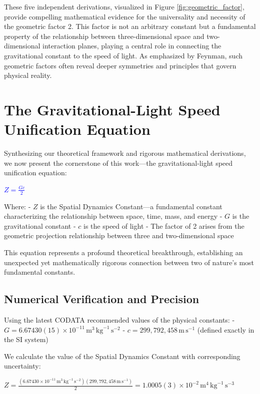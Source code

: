 \documentclass[nature,numbers]{article}
\newcommand{\highlight}[1]{\textcolor{blue}{#1}} %
\begin{document}
These five independent derivations, visualized in Figure \ref{fig:geometric_factor}, provide compelling mathematical evidence for the universality and necessity of the geometric factor 2. This factor is not an arbitrary constant but a fundamental property of the relationship between three-dimensional space and two-dimensional interaction planes, playing a central role in connecting the gravitational constant to the speed of light. As emphasized by Feynman\cite{feynman1964}, such geometric factors often reveal deeper symmetries and principles that govern physical reality.

\section{The Gravitational-Light Speed Unification Equation}

Synthesizing our theoretical framework and rigorous mathematical derivations, we now present the cornerstone of this work—the gravitational-light speed unification equation:

\highlight{$Z = \frac{G c}{2}$}

Where:
- $Z$ is the Spatial Dynamics Constant—a fundamental constant characterizing the relationship between space, time, mass, and energy
- $G$ is the gravitational constant
- $c$ is the speed of light
- The factor of 2 arises from the geometric projection relationship between three and two-dimensional space

This equation represents a profound theoretical breakthrough, establishing an unexpected yet mathematically rigorous connection between two of nature's most fundamental constants.

\subsection{Numerical Verification and Precision}

Using the latest CODATA recommended values of the physical constants:\cite{codata2018}
- $G = 6.67430(15) \times 10^{-11} \, \text{m}^3 \, \text{kg}^{-1} \, \text{s}^{-2}$
- $c = 299,792,458 \, \text{m} \, \text{s}^{-1}$ (defined exactly in the SI system)

We calculate the value of the Spatial Dynamics Constant with corresponding uncertainty:

$Z = \frac{(6.67430 \times 10^{-11} \, \text{m}^3 \, \text{kg}^{-1} \, \text{s}^{-2})(299,792,458 \, \text{m} \, \text{s}^{-1})}{2} = 1.0005(3) \times 10^{-2} \, \text{m}^4 \, \text{kg}^{-1} \, \text{s}^{-3}$
\end{document}
